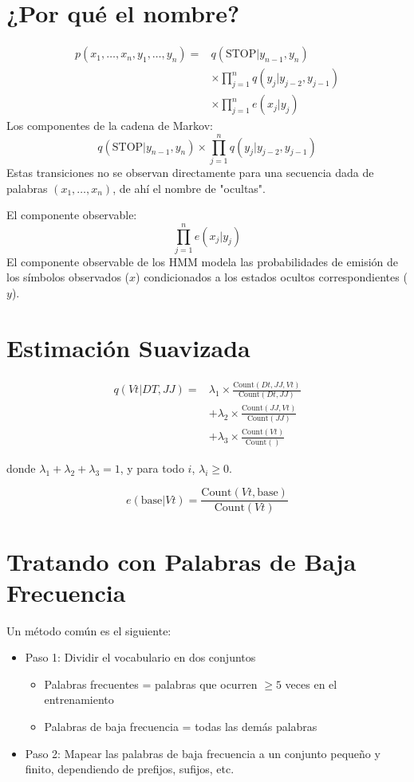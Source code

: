 \section{¿Por qué el nombre?}
\[
\begin{aligned}
  p(x_1, \ldots, x_n, y_1, \ldots, y_n) = & q(\text{STOP}|y_{n-1}, y_n) \\
  & \times \prod_{j=1}^{n} q(y_j | y_{j-2}, y_{j-1}) \\
  & \times \prod_{j=1}^{n} e(x_j | y_j)
\end{aligned}
\]
Los componentes de la cadena de Markov:
\[
q(\text{STOP}|y_{n-1}, y_n)\times \prod_{j=1}^{n} q(y_j | y_{j-2}, y_{j-1})
\]
Estas transiciones no se observan directamente para una secuencia dada de palabras $(x_1, \ldots, x_n)$, de ahí el nombre de "ocultas".

El componente observable:
\[
\prod_{j=1}^{n} e(x_j | y_j)
\]
El componente observable de los HMM modela las probabilidades de emisión de los símbolos observados ($x$) condicionados a los estados ocultos correspondientes ($y$).

\section{Estimación Suavizada}

\[
\begin{aligned}
q(Vt | DT, JJ) = & \lambda_1 \times \frac{{\text{Count}(Dt, JJ, Vt)}}{{\text{Count}(Dt, JJ)}} \\
& + \lambda_2 \times \frac{{\text{Count}(JJ, Vt)}}{{\text{Count}(JJ)}} \\
& + \lambda_3 \times \frac{{\text{Count}(Vt)}}{{\text{Count}()}}
\end{aligned}
\]

donde $\lambda_1 + \lambda_2 + \lambda_3 = 1$, y para todo $i$, $\lambda_i \geq 0$.

\vspace{0.5cm}

\[
e(\text{base} | Vt) = \frac{{\text{Count}(Vt, \text{base})}}{{\text{Count}(Vt)}}
\]

\section{Tratando con Palabras de Baja Frecuencia}

Un método común es el siguiente:
\begin{itemize}
  \item Paso 1: Dividir el vocabulario en dos conjuntos
    \begin{itemize}
      \item Palabras frecuentes = palabras que ocurren $\geq 5$ veces en el entrenamiento
      \item Palabras de baja frecuencia = todas las demás palabras
    \end{itemize}
  \item Paso 2: Mapear las palabras de baja frecuencia a un conjunto pequeño y finito, dependiendo de prefijos, sufijos, etc.
\end{itemize}

